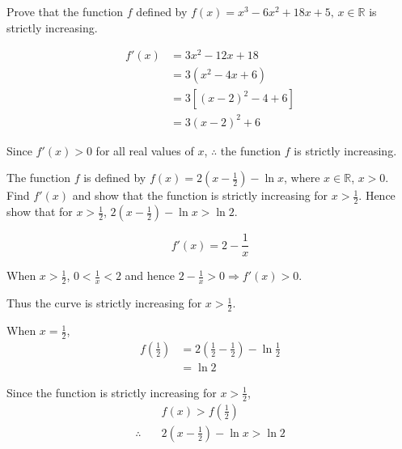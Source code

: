 \documentclass[11pt,a4paper]{book}
\newcommand{\R}{\mathbb{R}}
\begin{document}
\begin{example}


Prove that the function $f$ defined by $f\left(x\right)=x^{3}-6x^{2}+18x+5,\,x\in\R$
is strictly increasing.

\Solution

\begin{align*}
f'\left(x\right) & =3x^{2}-12x+18\\
 & =3\left(x^{2}-4x+6\right)\\
 & =3\left[\left(x-2\right)^{2}-4+6\right]\\
 & =3\left(x-2\right)^{2}+6
\end{align*}

Since $f'\left(x\right)>0$ for all real values of $x$, $\therefore$
the function $f$ is strictly increasing.

\end{example}


\begin{example}

The function $f$ is defined by ${\displaystyle f\left(x\right)=2\left(x-\frac{1}{2}\right)-\ln x}$,
where $x\in\R$, $x>0$. Find $f'\left(x\right)$ and show that the
function is strictly increasing for ${\displaystyle x>\frac{1}{2}}$.
Hence show that for ${\displaystyle x>\frac{1}{2}}$, ${\displaystyle 2\left(x-\frac{1}{2}\right)-\ln x>\ln2}$.

\Solution

\[
f'\left(x\right)=2-\frac{1}{x}
\]

When ${\displaystyle x>\frac{1}{2}}$, ${\displaystyle 0<\frac{1}{x}<2}$
and hence ${\displaystyle 2-\frac{1}{x}>0\Rightarrow f'\left(x\right)>0}$.

Thus the curve is strictly increasing for ${\displaystyle x>\frac{1}{2}}$.

When ${\displaystyle x=\frac{1}{2}}$,
\begin{align*}
f\left(\frac{1}{2}\right) & =2\left(\frac{1}{2}-\frac{1}{2}\right)-\ln\frac{1}{2}\\
 & =\ln2
\end{align*}

Since the function is strictly increasing for ${\displaystyle x>\frac{1}{2}}$,
\begin{align*}
 & f\left(x\right)>f\left(\frac{1}{2}\right)\\
\therefore\quad & 2\left(x-\frac{1}{2}\right)-\ln x>\ln2
\end{align*}

\end{example}
\end{document}

